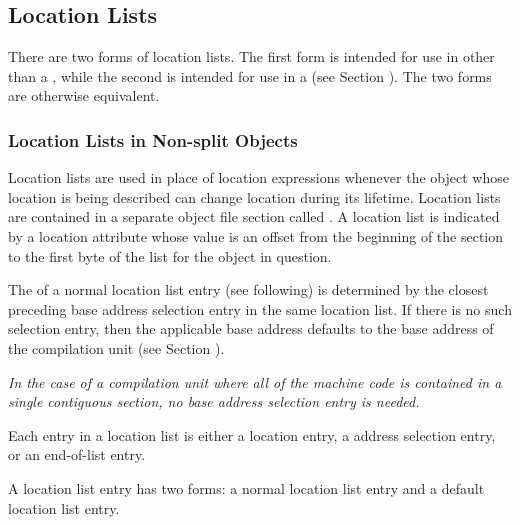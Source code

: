\subsection{Location Lists}
\label{chap:locationlists}
There are two forms of location lists. The first form 
is intended for use in other than a \splitDWARFobjectfile,
while the second is intended for use in a \splitDWARFobjectfile{} 
(see Section ). The two
forms are otherwise equivalent.

\bbpareb

\subsubsection{Location Lists in Non-split Objects}
\label{chap:locationlistsinnonsplitobjects}
Location lists 
are used in place of location expressions
whenever the object whose location is being described
can change location during its lifetime. 
Location lists
are contained in a separate object file section called
\dotdebugloc{}. A location list is indicated by a location
attribute whose value is an offset from the beginning of
the \dotdebugloc{} section to the first byte of the list for the
object in question.

The  of a normal
location list entry (see following) is
determined by the closest preceding base address selection
entry in the same location list. If there is
no such selection entry, then the applicable base address
defaults to the base address of the compilation unit (see
Section ).  

\textit{In the case of a compilation unit where all of
the machine code is contained in a single contiguous section,
no base address selection entry is needed.}

Each entry in a location list is either a location 
entry,
a 
address selection entry, 
or an 
end-of-list entry.

A location list entry has two forms:
a normal location list entry and a default location list entry.

